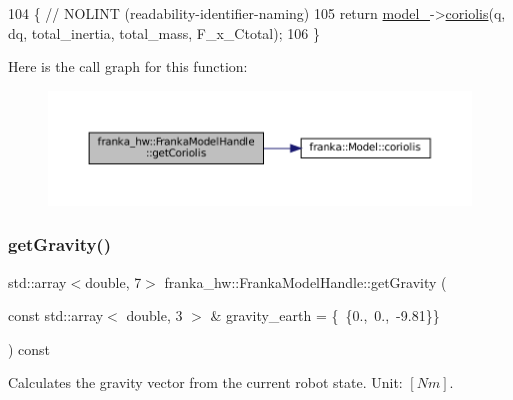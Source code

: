 \begin{DoxyCode}
104                                                    \{  \textcolor{comment}{// NOLINT (readability-identifier-naming)}
105     \textcolor{keywordflow}{return} \hyperlink{classfranka__hw_1_1FrankaModelHandle_a0c47e6c735f1bd809581b0498d53349b}{model\_}->\hyperlink{classfranka_1_1Model_a9be45a91c3288088dd222f2e55870aa8}{coriolis}(q, dq, total\_inertia, total\_mass, F\_x\_Ctotal);
106   \}
\end{DoxyCode}
Here is the call graph for this function\+:
\nopagebreak
\begin{figure}[H]
\begin{center}
\leavevmode
\includegraphics[width=350pt]{classfranka__hw_1_1FrankaModelHandle_aa503a5006467f3fd48140a296362e1d1_cgraph}
\end{center}
\end{figure}
\mbox{\label{classfranka__hw_1_1FrankaModelHandle_ac6ad04268fd86d0442733000025c2230}} 
\subsubsection{\texorpdfstring{get\+Gravity()}{getGravity()}\hspace{0.1cm}{\footnotesize\ttfamily [1/2]}}
{\footnotesize\ttfamily std\+::array$<$double, 7$>$ franka\+\_\+hw\+::\+Franka\+Model\+Handle\+::get\+Gravity (\begin{DoxyParamCaption}\item[{const std\+::array$<$ double, 3 $>$ \&}]{gravity\+\_\+earth = {\ttfamily \{~\{0.,~0.,~-\/9.81\}\}} }\end{DoxyParamCaption}) const\hspace{0.3cm}{\ttfamily [inline]}}

Calculates the gravity vector from the current robot state. Unit\+: $[Nm]$.


